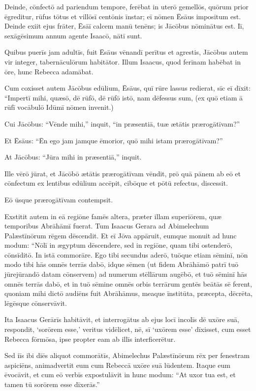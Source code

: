\Versus Deinde, cōnfectō ad pariendum tempore, ferēbat in uterō gemellōs,
\Versus quōrum prior ēgreditur, rūfus tōtus et villōsī centōnis īnstar; eī nōmen Ēsāus impositum est.
\Versus Deinde exiit ejus frāter, Ēsāī calcem manū tenēns; is Jācōbus nōminātus est. Iī, sexāgēsimum annum agente Isaacō, nātī sunt.

\Versus Quibus puerīs jam adultīs, fuit Ēsāus vēnandī perītus et agrestis, Jācōbus autem vir integer, tabernāculōrum habitātor.
\Versus Illum Isaacus, quod ferīnam habēbat in ōre, hunc Rebecca adamābat.

\Versus Cum coxisset autem Jācōbus edūlium, Ēsāus, quī rūre lassus redierat, sīc eī dīxit:
\Versus ``Impertī mihi, quæsō, dē rūfō, dē rūfō istō, nam dēfessus sum, (ex quō etiam ā rūfī vocābulō Idūmī nōmen invenit.)

\Versus Cui Jācōbus: ``Vēnde mihi,'' inquit, ``in præsentiā, tuæ ætātis prærogātīvam?''

\Versus Et Ēsāus: ``Ēn ego jam jamque ēmorior, quō mihi istam prærogātīvam?''

\Versus At Jācōbus: ``Jūra mihi in præsentiā,'' inquit.

Ille vērō jūrat, et Jācōbō ætātis prærogātīvam vēndit,
\Versus prō quā pānem ab eō et cōnfectum ex lentibus edūlium accēpit, cibōque et pōtū refectus, discessit.

Eō ūsque prærogātīvam contempsit.



\Caput
\Versus Exstitit autem in eā regiōne famēs altera, præter illam superiōrem, quæ temporibus Abrāhāmī fuerat. Tum Isaacus Gerara ad Abimelechum Palæstīnōrum rēgem dēscendit.
\Versus Et eī Jōva appāruit, eumque monuit ad hunc modum: ``Nōlī in ægyptum dēscendere, sed in regiōne, quam tibi ostenderō, cōnsīditō.
\Versus  In istā commorāre. Ego tibi secundus aderō, tuōque etiam sēminī, nōn modo tibi hās omnēs terrās dabō, idque sēmen (ut fidem Abrāhāmō patrī tuō jūrejūrandō datam cōnservem)
\Versus ad numerum stēllārum augēbō, et tuō sēminī hās omnēs terrās dabō, et in tuō sēmine omnēs orbis terrārum gentēs beātās sē ferent,
\Versus quoniam mihi dictō audiēns fuit Abrāhāmus, meaque īnstitūta, præcepta, dēcrēta, lēgēsque cōnservāvit.

\Versus Ita Isaacus Gerārīs habitāvit,
\Versus et interrogātus ab ejus locī incolīs dē uxōre suā, respondit, `sorōrem esse,' veritus vidēlicet, nē, sī `uxōrem esse' dīxisset, cum esset Rebecca fōrmōsa, ipse propter eam ab illīs interficerētur.

\Versus Sed iīs ibi diēs aliquot commorātīs, Abimelechus Palæstīnōrum rēx per fenestram aspiciēns, animadvertit eum cum Rebeccā uxōre suā lūdentem.
\Versus Itaque eum ēvocāvit, et cum eō verbīs expostulāvit in hunc modum: ``At uxor tua est, et tamen tū sorōrem esse dīxerās.''

